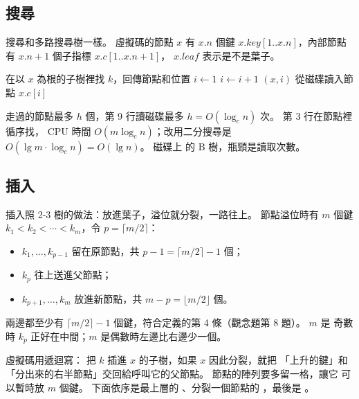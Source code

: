 \subsection{搜尋}

搜尋和多路搜尋樹一樣。 虛擬碼的節點 $x$ 有 $x.n$ 個鍵
$x.\mathit{key}[1..x.n]$，內部節點有 $x.n + 1$ 個子指標 $x.c[1..x.n+1]$，
$x.\mathit{leaf}$ 表示是不是葉子。

\begin{pseudo}[label=alg:mw-search, unbreakable]{在以 $x$ 為根的子樹裡找 $k$，回傳節點和位置}
    \State $i \gets 1$
        \State $i \gets i + 1$
    \EndWhile
        \State \Return $(x, i)$
    \EndIf
        \State \Return \NIL
    \EndIf
    \State 從磁碟讀入節點 $x.c[i]$
    \State \Return {}
\EndFunction
\end{pseudo}

走過的節點最多 $h$ 個，第 9 行讀磁碟最多 $h = O(\log_c n)$ 次。 第 3 行在節點裡循序找，
CPU 時間 $O(m \log_c n)$；改用二分搜尋是 $O(\lg m \cdot \log_c n) = O(\lg n)$。 磁碟上
的 B 樹，瓶頸是讀取次數。

\subsection{插入}
\label{sec:mw-insert}

插入照 2-3 樹的做法：放進葉子，溢位就分裂，一路往上。 節點溢位時有 $m$ 個鍵
$k_1 < k_2 < \cdots < k_m$，令 $p = \lceil m/2 \rceil$：
\begin{itemize}
\item $k_1, \ldots, k_{p-1}$ 留在原節點，共 $p - 1 = \lceil m/2 \rceil - 1$ 個；
\item $k_p$ 往上送進父節點；
\item $k_{p+1}, \ldots, k_m$ 放進新節點，共 $m - p = \lfloor m/2 \rfloor$ 個。
\end{itemize}
兩邊都至少有 $\lceil m/2 \rceil - 1$ 個鍵，符合定義的第 4 條（觀念題第 8 題）。 $m$ 是
奇數時 $k_p$ 正好在中間；$m$ 是偶數時左邊比右邊少一個。

虛擬碼用遞迴寫： 把 $k$ 插進 $x$ 的子樹，如果 $x$ 因此分裂，就把
「上升的鍵」和「分出來的右半節點」交回給呼叫它的父節點。 節點的陣列要多留一格，讓它
可以暫時放 $m$ 個鍵。 下面依序是最上層的 、分裂一個節點的
，最後是 。

